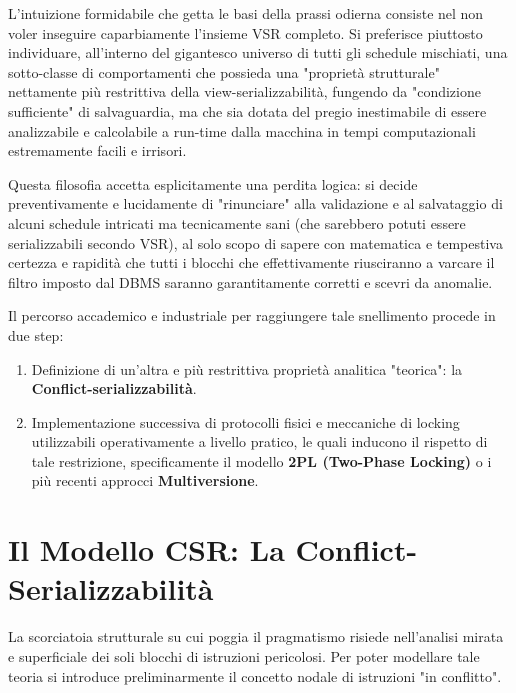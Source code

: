 L'intuizione formidabile che getta le basi della prassi odierna consiste nel non voler inseguire caparbiamente l'insieme VSR completo. Si preferisce piuttosto individuare, all'interno del gigantesco universo di tutti gli schedule mischiati, una sotto-classe di comportamenti che possieda una "proprietà strutturale" nettamente più restrittiva della view-serializzabilità, fungendo da "condizione sufficiente" di salvaguardia, ma che sia dotata del pregio inestimabile di essere analizzabile e calcolabile a run-time dalla macchina in tempi computazionali estremamente facili e irrisori.

Questa filosofia accetta esplicitamente una perdita logica: si decide preventivamente e lucidamente di "rinunciare" alla validazione e al salvataggio di alcuni schedule intricati ma tecnicamente sani (che sarebbero potuti essere serializzabili secondo VSR), al solo scopo di sapere con matematica e tempestiva certezza e rapidità che tutti i blocchi che effettivamente riusciranno a varcare il filtro imposto dal DBMS saranno garantitamente corretti e scevri da anomalie.

Il percorso accademico e industriale per raggiungere tale snellimento procede in due step:
\begin{enumerate}
    \item Definizione di un'altra e più restrittiva proprietà analitica "teorica": la \textbf{Conflict-serializzabilità}.
    \item Implementazione successiva di protocolli fisici e meccaniche di locking utilizzabili operativamente a livello pratico, le quali inducono il rispetto di tale restrizione, specificamente il modello \textbf{2PL (Two-Phase Locking)} o i più recenti approcci \textbf{Multiversione}.
\end{enumerate}

\section{Il Modello CSR: La Conflict-Serializzabilità}

La scorciatoia strutturale su cui poggia il pragmatismo risiede nell'analisi mirata e superficiale dei soli blocchi di istruzioni pericolosi. Per poter modellare tale teoria si introduce preliminarmente il concetto nodale di istruzioni "in conflitto".

